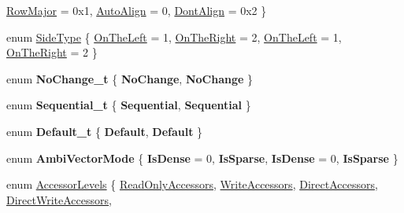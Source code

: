 \begin{DoxyCompactItemize}
\hyperlink{group__enums_ggaacded1a18ae58b0f554751f6cdf9eb13acfcde9cd8677c5f7caf6bd603666aae3}{Row\+Major} = 0x1, 
\hyperlink{group__enums_ggaacded1a18ae58b0f554751f6cdf9eb13a28d63c0dd8560827162decfd898804f4}{Auto\+Align} = 0, 
\hyperlink{group__enums_ggaacded1a18ae58b0f554751f6cdf9eb13a40a452614141522dd313363dbbd65726}{Dont\+Align} = 0x2
 \}
\item 
enum \hyperlink{group__enums_gac22de43beeac7a78b384f99bed5cee0b}{Side\+Type} \{ \hyperlink{group__enums_ggac22de43beeac7a78b384f99bed5cee0ba129609b3bdf23b071f5f86cf2f995ec4}{On\+The\+Left} = 1, 
\hyperlink{group__enums_ggac22de43beeac7a78b384f99bed5cee0ba99dc75d8e00b6c3a5bdc31940f47492b}{On\+The\+Right} = 2, 
\hyperlink{group__enums_ggac22de43beeac7a78b384f99bed5cee0ba129609b3bdf23b071f5f86cf2f995ec4}{On\+The\+Left} = 1, 
\hyperlink{group__enums_ggac22de43beeac7a78b384f99bed5cee0ba99dc75d8e00b6c3a5bdc31940f47492b}{On\+The\+Right} = 2
 \}
\item 
\mbox{\label{namespace_eigen_a57fe75444f853cd2dd2b6b94e27dcac7}} 
enum {\bfseries No\+Change\+\_\+t} \{ {\bfseries No\+Change}, 
{\bfseries No\+Change}
 \}
\item 
\mbox{\label{namespace_eigen_ac44c6508f8e204a03efbfd555a63a21f}} 
enum {\bfseries Sequential\+\_\+t} \{ {\bfseries Sequential}, 
{\bfseries Sequential}
 \}
\item 
\mbox{\label{namespace_eigen_a644c9489710c76e32bd3a9b15d83ca43}} 
enum {\bfseries Default\+\_\+t} \{ {\bfseries Default}, 
{\bfseries Default}
 \}
\item 
\mbox{\label{namespace_eigen_a59b71c21bbdd3b0bb8a7a1dffd92e1bf}} 
enum {\bfseries Ambi\+Vector\+Mode} \{ {\bfseries Is\+Dense} = 0, 
{\bfseries Is\+Sparse}, 
{\bfseries Is\+Dense} = 0, 
{\bfseries Is\+Sparse}
 \}
\item 
enum \hyperlink{group__enums_ga9f93eac38eb83deb0e8dbd42ddf11d5d}{Accessor\+Levels} \{ \newline
\hyperlink{group__enums_gga9f93eac38eb83deb0e8dbd42ddf11d5da42865f87356ad7e585a1bfbfd1b81699}{Read\+Only\+Accessors}, 
\hyperlink{group__enums_gga9f93eac38eb83deb0e8dbd42ddf11d5da2c59ef3697d65866c3a8e16eda7881ab}{Write\+Accessors}, 
\hyperlink{group__enums_gga9f93eac38eb83deb0e8dbd42ddf11d5da47996b52dd3a8c298a8821675a557c55}{Direct\+Accessors}, 
\hyperlink{group__enums_gga9f93eac38eb83deb0e8dbd42ddf11d5dae218802d4436c6907e60368c28609472}{Direct\+Write\+Accessors}, 

\end{DoxyCompactItemize}
